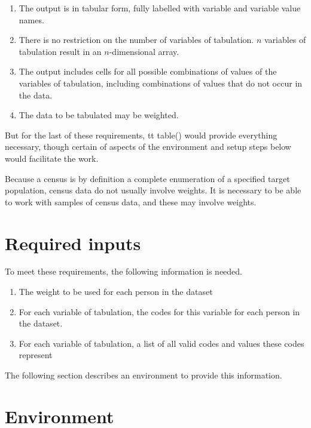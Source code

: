 \begin{enumerate}
\item The output is in tabular form, fully labelled with variable and variable value names.

\item There is no restriction on the number of variables of tabulation. $n$ variables of tabulation result in an $n$-dimensional array.

\item The output includes cells for all possible combinations of values of the variables of tabulation, including combinations of values that do not occur in the data.

\item The data to be tabulated may be weighted.
\end{enumerate}

But for the last of these requirements, {tt table()} would provide everything necessary, though certain of aspects of the environment and setup steps below would facilitate the work.

Because a census is by definition a complete enumeration of a specified target population, census data do not usually involve weights. It is necessary to be able to work with samples of census data, and these may involve weights.


\section{Required inputs}

To meet these requirements, the following information is needed.

\begin{enumerate}

\item The weight to be used for each person in the dataset

\item For each variable of tabulation, the codes for this variable for each person in the dataset.

\item For each variable of tabulation, a list of all valid codes and values these codes represent
\end{enumerate}

The following section describes an environment to provide this information.


\section{Environment}

